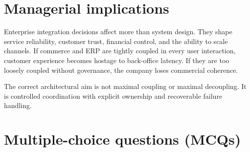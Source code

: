 \section{Managerial implications}
Enterprise integration decisions affect more than system design.
They shape service reliability, customer trust, financial control, and the ability to scale channels.
If commerce and ERP are tightly coupled in every user interaction, customer experience becomes hostage to back-office latency.
If they are too loosely coupled without governance, the company loses commercial coherence.

The correct architectural aim is not maximal coupling or maximal decoupling.
It is controlled coordination with explicit ownership and recoverable failure handling.

\section{Multiple-choice questions (MCQs)}
